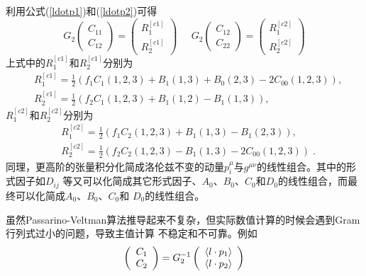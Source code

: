 利用公式(\ref{ldotp1})和(\ref{ldotp2})可得
\begin{equation}
G_2 \left( \begin{array}{c} C_{11}\\
                            C_{12} \end{array}\right) =
\left( \begin{array}{c} R^{[c1]}_1\\
                        R^{[c1]}_2 \end{array}\right)
\;\;\;\;\;
G_2 \left( \begin{array}{c} C_{12}\\
                            C_{22} \end{array}\right) =
\left( \begin{array}{c} R^{[c2]}_1\\
                        R^{[c2]}_2 \end{array}\right)
\label{Cformfactoreq3}
\end{equation}
上式中的$R^{[c1]}_1$和$R^{[c1]}_2$分别为
\begin{equation}
\begin{split}
& R^{[c1]}_{1} 
=\frac{1}{2} (f_1 C_{1}(1,2,3)+B_1(1,3)+B_0(2,3)-2 C_{00}(1,2,3)), \\ 
& R^{[c1]}_{2} =\frac{1}{2} (f_2 C_{1}(1,2,3)+B_1(1,2)-B_1(1,3)),  
\label{Rc1}
\end{split}
\end{equation}
$R^{[c2]}_1$和$R^{[c2]}_2$分别为
\begin{equation}
\begin{split}
& R^{[c2]}_{1}=\frac{1}{2} (f_1 C_{2}(1,2,3)+B_1(1,3)-B_1(2,3)), \\ 
& R^{[c2]}_{2}=\frac{1}{2} (f_2 C_{2}(1,2,3)-B_1(1,3)-2 C_{00}(1,2,3))\; . 
\label{Rc2}
\end{split}
\end{equation}
同理，更高阶的张量积分化简成洛伦兹不变的动量$p^{\mu}_i$与$g^{\mu\nu}$的线性组合。其中的形式因子如$D_{ij}$
等又可以化简成其它形式因子、$A_0$、$B_0$、$C_0$和$D_0$的线性组合，而最终可以化简成$A_0$、$B_0$、$C_0$和
$D_0$的线性组合。

虽然Passarino-Veltman算法推导起来不复杂，但实际数值计算的时候会遇到Gram行列式过小的问题，导致主值计算
不稳定和不可靠。例如
\begin{equation}
\left(\begin{array}{c} C_1\\
                       C_2  \end{array}\right)
= {\boldmath G_2^{-1}} \left(\begin{array}{c} \langle  l \cdot p_{1} \rangle  \\
                                               \langle  l \cdot p_{2} \rangle  
                                               \end{array}\right)
\label{eq347}
\end{equation}

